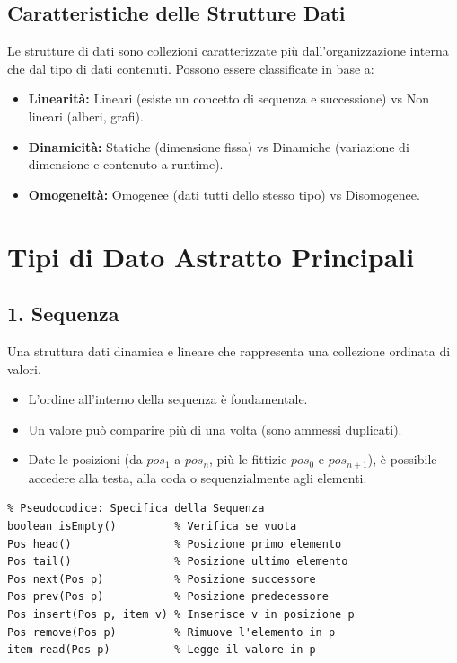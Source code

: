 \documentclass[12pt, a4paper]{article}
\begin{document}
\subsection{Caratteristiche delle Strutture Dati}
Le strutture di dati sono collezioni caratterizzate più dall'organizzazione interna che dal tipo di dati contenuti. Possono essere classificate in base a:
\begin{itemize}
\item \textbf{Linearità:} Lineari (esiste un concetto di sequenza e successione) vs Non lineari (alberi, grafi).
\item \textbf{Dinamicità:} Statiche (dimensione fissa) vs Dinamiche (variazione di dimensione e contenuto a runtime).
\item \textbf{Omogeneità:} Omogenee (dati tutti dello stesso tipo) vs Disomogenee.
\end{itemize}

\newpage

\section{Tipi di Dato Astratto Principali}

\subsection{1. Sequenza}
Una struttura dati dinamica e lineare che rappresenta una collezione ordinata di valori.
\begin{itemize}
\item L'ordine all'interno della sequenza è fondamentale.
\item Un valore può comparire più di una volta (sono ammessi duplicati).
\item Date le posizioni (da $pos_1$ a $pos_n$, più le fittizie $pos_0$ e $pos_{n+1}$), è possibile accedere alla testa, alla coda o sequenzialmente agli elementi.
\end{itemize}

\begin{verbatim}
% Pseudocodice: Specifica della Sequenza
boolean isEmpty()         % Verifica se vuota
Pos head()                % Posizione primo elemento
Pos tail()                % Posizione ultimo elemento
Pos next(Pos p)           % Posizione successore
Pos prev(Pos p)           % Posizione predecessore
Pos insert(Pos p, item v) % Inserisce v in posizione p
Pos remove(Pos p)         % Rimuove l'elemento in p
item read(Pos p)          % Legge il valore in p
\end{verbatim}
\end{document}
